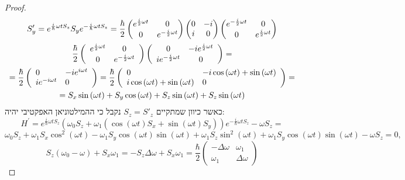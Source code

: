 \documentclass{tstextbook}
\begin{document}
\begin{proof}
\begin{gather*}S_{y}^{\prime}=e^{\frac{i}{\hbar}\omega t S_{z}}S_{y}e^{-\frac{i}{\hbar}\omega t S_{z}}=\frac{\hbar}{2}\begin{pmatrix}e^{\frac{i}{2}\omega t}&0\\ 0&e^{-\frac{i}{2}\omega t}\end{pmatrix}\begin{pmatrix}0&-i\\ i&0\end{pmatrix}\begin{pmatrix}e^{-\frac{i}{2}\omega t}&0\\ 0&e^{\frac{i}{2}\omega t}\end{pmatrix}\\ \frac{\hbar}{2}\left(\begin{array}{c c}{{e^{\frac{i}{2}\omega t}}}&{{0}}\\ {{0}}&{{e^{-\frac{i}{2}\omega t}}}\end{array}\right)\left(\begin{array}{c c}{{0}}&{{-i e^{\frac{i}{2}\omega t}}}\\ {{i e^{-\frac{i}{2}\omega t}}}&{{0}}\end{array}\right)=\\={\frac{\hbar}{2}}\left({\begin{array}{l l}{0}&{-i e^{i\omega t}}\\ {i e^{-i\omega t}}&{0}\end{array}}\right)={\frac{\hbar}{2}}\left({\begin{array}{l l}{0}&{-i\cos\left( \omega t \right)+\sin\left( \omega t \right)}\\ {i\cos\left( \omega t \right)+\sin\left( \omega t \right)}&{0}\end{array}}\right)=\\=S_{x}\sin\left( \omega t \right)+S_{y}\cos\left( \omega t \right)+S_{z}\sin\left( \omega t \right)+S_{z}\sin\left( \omega t \right) 
\end{gather*}
כאשר כיוון שמתקיים \(S_{z}=S'_{z}\) נקבל כי ההמילטוניאן האפקטיבי יהיה:
$$H^{\prime}=e^{\frac{i}{\hbar}\omega t S_{z}}\left(\omega_{0}S_{z}+\omega_{1}\left(\cos(\omega t)S_{x}+\sin(\omega t)S_{y}\right)\right)e^{-\frac{i}{\hbar}\omega t S_{z}}-\omega S_{z}=$$$$\omega_{0}S_{z}+\omega_{1}S_{x}\cos^{2}(\omega t)-\omega_{1}S_{y}\cos(\omega t)\sin(\omega t)+\omega_{1}S_{z}\sin^{2}(\omega t)+\omega_{1}S_{y}\cos(\omega t)\sin(\omega t)-\omega S_{z}=0,$$$$S_{z}\left(\omega_{0}-\omega\right)+S_{x}\omega_{1}=-S_{z}\Delta\omega+S_{x}\omega_{1}=\frac{\hbar}{2}\begin{pmatrix}-\Delta\omega&\omega_{1}\\ \omega_{1}&\Delta\omega\end{pmatrix}$$

\end{proof}
\end{document}
